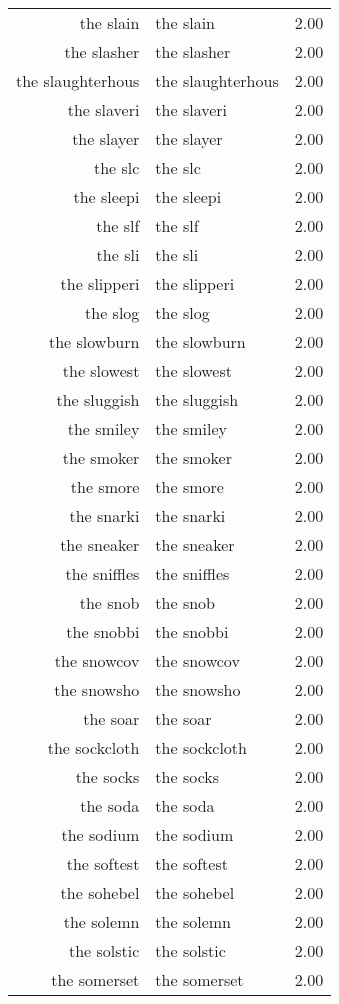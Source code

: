 \begin{table}[ht]
\begin{tabular}{rlr}
  the slain & the slain & 2.00 \\ 
  the slasher & the slasher & 2.00 \\ 
  the slaughterhous & the slaughterhous & 2.00 \\ 
  the slaveri & the slaveri & 2.00 \\ 
  the slayer & the slayer & 2.00 \\ 
  the slc & the slc & 2.00 \\ 
  the sleepi & the sleepi & 2.00 \\ 
  the slf & the slf & 2.00 \\ 
  the sli & the sli & 2.00 \\ 
  the slipperi & the slipperi & 2.00 \\ 
  the slog & the slog & 2.00 \\ 
  the slowburn & the slowburn & 2.00 \\ 
  the slowest & the slowest & 2.00 \\ 
  the sluggish & the sluggish & 2.00 \\ 
  the smiley & the smiley & 2.00 \\ 
  the smoker & the smoker & 2.00 \\ 
  the smore & the smore & 2.00 \\ 
  the snarki & the snarki & 2.00 \\ 
  the sneaker & the sneaker & 2.00 \\ 
  the sniffles & the sniffles & 2.00 \\ 
  the snob & the snob & 2.00 \\ 
  the snobbi & the snobbi & 2.00 \\ 
  the snowcov & the snowcov & 2.00 \\ 
  the snowsho & the snowsho & 2.00 \\ 
  the soar & the soar & 2.00 \\ 
  the sockcloth & the sockcloth & 2.00 \\ 
  the socks & the socks & 2.00 \\ 
  the soda & the soda & 2.00 \\ 
  the sodium & the sodium & 2.00 \\ 
  the softest & the softest & 2.00 \\ 
  the sohebel & the sohebel & 2.00 \\ 
  the solemn & the solemn & 2.00 \\ 
  the solstic & the solstic & 2.00 \\ 
  the somerset & the somerset & 2.00 \\ 

\end{tabular}
\end{table}
